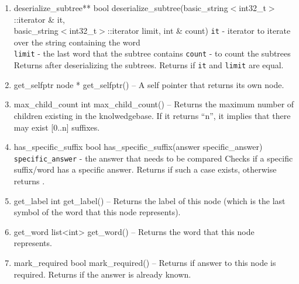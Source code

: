 \begin{enumerate}
\begin{detail}
{Converts the subtree into \stringtype and appended to \texttt{into}. This method is used during serialization} 
\end{detail}
\item \begin{detail}
{deserialize\_subtree**}
{bool deserialize\_subtree(basic\_string$<$int32\_t$>$::iterator \& it, \\ basic\_string$<$int32\_t$>$::iterator limit, int \& count)}
{
\texttt{it} - iterator to iterate over the string containing the word \\
\texttt{limit} - the last word that the subtree contains
\texttt{count} - \integer to count the subtrees
 }
{Returns \true after deserializing the subtrees. Returns \false if \texttt{it} and \texttt{limit} are equal.} 
\end{detail}
\item \begin{detail}
{get\_selfptr}
{node * get\_selfptr()}
{--}
{A self pointer that returns its own node.} 
\end{detail}
\item \begin{detail}
{max\_child\_count}
{int max\_child\_count()}
{--}
{Returns the maximum number of children existing in the knolwedgebase. If it returns ``n'', it implies that there may exist [0..n] suffixes.} 
\end{detail}
\item \begin{detail}
{has\_specific\_suffix}
{bool has\_specific\_suffix(answer specific\_answer)}
{\texttt{specific\_answer} - the answer that needs to be compared}
{Checks if a specific suffix/word has a specific answer. Returns \true if such a case exists, otherwise returns \false.} 
\end{detail}
\item \begin{detail}
{get\_label}
{int get\_label()}
{--}
{Returns the label of this node (which is the last symbol of the word that this node represents).} 
\end{detail}
\item \begin{detail}
{get\_word}
{list<int> get\_word()}
{--}
{Returns the word that this node represents.} 
\end{detail}
\item \begin{detail}
{mark\_required}
{bool mark\_required()}
{--}
{Returns \true if answer to this node is required. Returns \false if the answer is already known.} 

\end{detail}
\end{enumerate}
